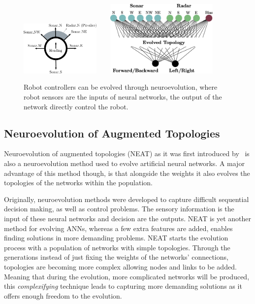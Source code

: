 \begin{figure}[t!]
\centering
\includegraphics[width=0.35\textwidth]{../Figures/Misc/RobotMaze.eps}\  \    \  \    
\includegraphics[width=0.49\textwidth]{../Figures/Misc/RobotMazeNetwork.eps}
\caption{Robot controllers can be evolved through neuroevolution, where robot sensors are the inputs of neural networks, the output of the network directly control the robot.}
\label{fig:robotExample}
\end{figure}


\subsection{Neuroevolution of Augmented Topologies}
\label{NEAT}

Neuroevolution of augmented topologies (NEAT) as it was first introduced by~\citep{stanley2002evolving} is also a neuroevolution method used to evolve artificial neural networks. A major advantage of this method though, is that alongside the weights it also evolves the topologies of the networks within the population.

Originally, neuroevolution methods were developed to capture difficult sequential decision making, as well as control problems. The sensory information is the input of these neural networks and decision are the outputs. NEAT is yet another method for evolving ANNs, whereas a few extra features are added, enables finding solutions in more demanding problems. NEAT starts the evolution process with a population of networks with simple topologies. Through the generations instead of just fixing the weights of the networks' connections, topologies are becoming more complex allowing nodes and links to be added. Meaning that during the evolution, more complicated networks will be produced, this \emph{complexifying} technique leads to capturing more demanding solutions as it offers enough freedom to the evolution.

